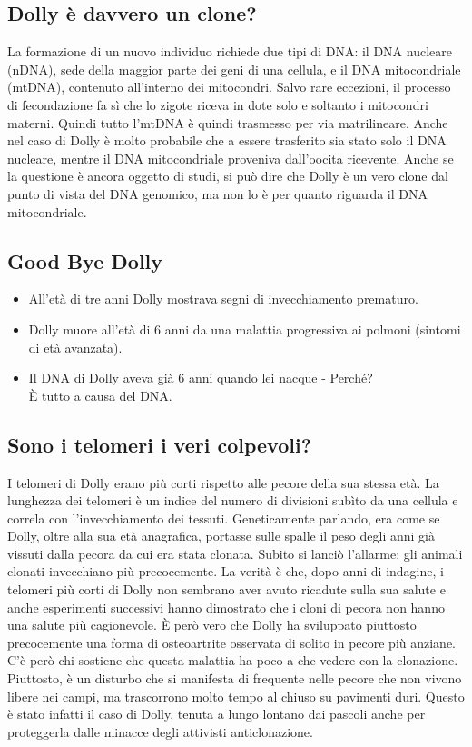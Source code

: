 \documentclass{article}
\begin{document}
\subsection{Dolly è davvero un clone?} La formazione di un nuovo individuo richiede due tipi di DNA: il DNA nucleare (nDNA), sede della maggior parte dei geni di una cellula, e il DNA mitocondriale (mtDNA), contenuto all'interno dei mitocondri. Salvo rare eccezioni, il processo di fecondazione fa sì che lo zigote riceva in dote solo e soltanto i mitocondri materni. Quindi tutto l'mtDNA è quindi trasmesso per via matrilineare. Anche nel caso di Dolly è molto probabile che a essere trasferito sia stato solo il DNA nucleare, mentre il DNA mitocondriale proveniva dall'oocita ricevente. Anche se la questione è ancora oggetto di studi, si può dire che Dolly è un vero clone dal punto di vista del DNA genomico, ma non lo è per quanto riguarda il DNA mitocondriale. 
\subsection{Good Bye Dolly}
\begin{itemize}
    \item All'età di tre anni Dolly mostrava segni di invecchiamento prematuro. 
    \item Dolly muore all'età di 6 anni da una malattia progressiva ai polmoni (sintomi di età avanzata). 
    \item Il DNA di Dolly aveva già 6 anni quando lei nacque - Perché? \\[1ex] È tutto a causa del DNA.
\end{itemize}
\subsection{Sono i telomeri i veri colpevoli?}I telomeri di Dolly erano più corti rispetto alle pecore della sua stessa età. La lunghezza dei telomeri è un indice del numero di divisioni subìto da una cellula e correla con l'invecchiamento dei tessuti. Geneticamente parlando, era come se Dolly, oltre alla sua età anagrafica, portasse sulle spalle il peso degli anni già vissuti dalla pecora da cui era stata clonata. Subito si lanciò l'allarme: gli animali clonati invecchiano più precocemente. La verità è che, dopo anni di indagine, i telomeri più corti di Dolly non sembrano aver avuto ricadute sulla sua salute e anche esperimenti successivi hanno dimostrato che i cloni di pecora non hanno una salute più cagionevole. È però vero che Dolly ha sviluppato piuttosto precocemente una forma di osteoartrite osservata di solito in pecore più anziane. 
\\[1ex]C'è però chi sostiene che questa malattia ha poco a che vedere con la clonazione. Piuttosto, è un disturbo che si manifesta di frequente nelle pecore che non vivono libere nei campi, ma trascorrono molto tempo al chiuso su pavimenti duri. Questo è stato infatti il caso di Dolly, tenuta a lungo lontano dai pascoli anche per proteggerla dalle minacce degli attivisti anticlonazione. 
\end{document}
